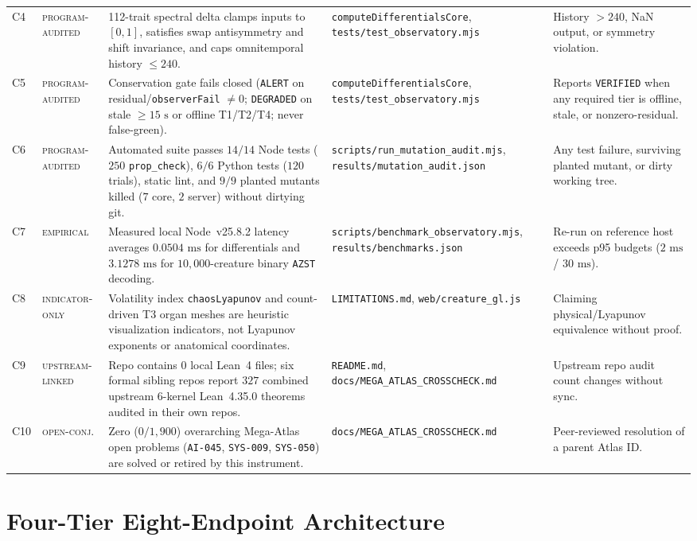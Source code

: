 \documentclass[11pt,reqno]{amsart}
\theoremstyle{definition}
\newcommand{\tcode}[1]{{\scriptsize\nolinkurl{#1}}}
\newcommand{\tagpa}{\textsc{program-audited}}
\newcommand{\tagem}{\textsc{empirical}}
\newcommand{\tagio}{\textsc{indicator-only}}
\newcommand{\tagul}{\textsc{upstream-linked}}
\newcommand{\tagoc}{\textsc{open-conj.}}
\begin{document}
\begin{table}[t]
\begin{tabularx}{\textwidth}{@{}P{0.48cm}P{2.05cm}YP{2.75cm}P{2.55cm}@{}}
C4 & \tagpa & 112-trait spectral delta clamps inputs to $[0,1]$, satisfies swap antisymmetry and shift invariance, and caps omnitemporal history $\le 240$. & \tcode{computeDifferentialsCore}, \tcode{tests/test_observatory.mjs} & History $> 240$, NaN output, or symmetry violation. \\
C5 & \tagpa & Conservation gate fails closed (\tcode{ALERT} on residual/\tcode{observerFail} $\neq 0$; \tcode{DEGRADED} on stale $\ge 15\text{ s}$ or offline T1/T2/T4; never false-green). & \tcode{computeDifferentialsCore}, \tcode{tests/test_observatory.mjs} & Reports \tcode{VERIFIED} when any required tier is offline, stale, or nonzero-residual. \\
C6 & \tagpa & Automated suite passes $14/14$ Node tests ($250$ \tcode{prop\_check}), $6/6$ Python tests ($120$ trials), static lint, and $9/9$ planted mutants killed ($7$ core, $2$ server) without dirtying git. & \tcode{scripts/run_mutation_audit.mjs}, \tcode{results/mutation_audit.json} & Any test failure, surviving planted mutant, or dirty working tree. \\
C7 & \tagem & Measured local Node~v25.8.2 latency averages $0.0504\text{ ms}$ for differentials and $3.1278\text{ ms}$ for $10{,}000$-creature binary \tcode{AZST} decoding. & \tcode{scripts/benchmark_observatory.mjs}, \tcode{results/benchmarks.json} & Re-run on reference host exceeds p95 budgets ($2\text{ ms}$ / $30\text{ ms}$). \\
C8 & \tagio & Volatility index \tcode{chaosLyapunov} and count-driven T3 organ meshes are heuristic visualization indicators, not Lyapunov exponents or anatomical coordinates. & \tcode{LIMITATIONS.md}, \tcode{web/creature_gl.js} & Claiming physical/Lyapunov equivalence without proof. \\
C9 & \tagul & Repo contains $0$ local Lean~4 files; six formal sibling repos report $327$ combined upstream 6-kernel Lean~4.35.0 theorems audited in their own repos. & \tcode{README.md}, \tcode{docs/MEGA_ATLAS_CROSSCHECK.md} & Upstream repo audit count changes without sync. \\
C10 & \tagoc & Zero ($0 / 1{,}900$) overarching Mega-Atlas open problems (\tcode{AI-045}, \tcode{SYS-009}, \tcode{SYS-050}) are solved or retired by this instrument. & \tcode{docs/MEGA_ATLAS_CROSSCHECK.md} & Peer-reviewed resolution of a parent Atlas ID. \\
\bottomrule
\end{tabularx}
\end{table}

\section{Four-Tier Eight-Endpoint Architecture}
\label{sec:architecture}
\end{document}

